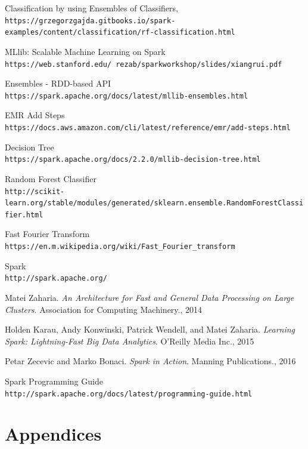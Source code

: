 \documentclass{neu_handout}
\begin{document}
\begin{thebibliography}{9}
Classification by using Ensembles of Classifiers,
\\\texttt{https://grzegorzgajda.gitbooks.io/spark-examples/content/classification/rf-classification.html}


MLlib: Scalable Machine Learning on Spark
\\\texttt{https://web.stanford.edu/~rezab/sparkworkshop/slides/xiangrui.pdf}


Ensembles - RDD-based API
\\\texttt{https://spark.apache.org/docs/latest/mllib-ensembles.html}

EMR Add Steps
\\\texttt{https://docs.aws.amazon.com/cli/latest/reference/emr/add-steps.html}

Decision Tree
\\\texttt{https://spark.apache.org/docs/2.2.0/mllib-decision-tree.html}

Random Forest Classifier
\\\texttt{http://scikit-learn.org/stable/modules/generated/sklearn.ensemble.RandomForestClassifier.html}

Fast Fourier Transform
\\\texttt{https://en.m.wikipedia.org/wiki/Fast\_Fourier\_transform}

Spark
\\\texttt{http://spark.apache.org/}


 Matei Zaharia. \textsl{An Architecture for Fast and General Data Processing on
Large Clusters}. Association for Computing Machinery., 2014

 Holden Karau, Andy Konwinski, Patrick Wendell, and Matei Zaharia. \textsl{Learning Spark: Lightning-Fast Big Data Analytics}. O'Reilly Media Inc., 2015

 Petar Zecevic and Marko Bonaci. \textsl{Spark in Action}. Manning
Publications., 2016

Spark Programming Guide
\\\texttt{http://spark.apache.org/docs/latest/programming-guide.html}

\end{thebibliography}

\newpage

\appendix
\section*{Appendices}
\end{document}
